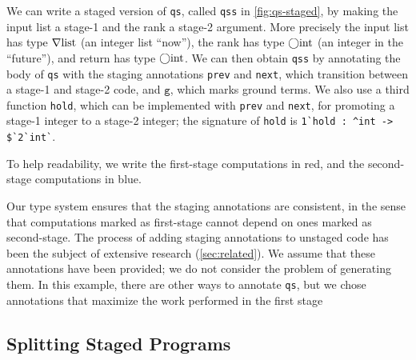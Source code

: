 \begin{abstrsyn}
We can write a staged version of \texttt{qs}, called
\texttt{qss} in \ref{fig:qs-staged}, by making the input list a
stage-1 and the rank a stage-2 argument. 
%
More precisely the input list
has type $\nabla\mathrm{list}$ (an integer list ``now''), the rank has
type $\bigcirc{\rm int}$ (an integer in the ``future''), and return has type
$\bigcirc{\rm int}$.  
%
We can then obtain \texttt{qss} by annotating the body of \texttt{qs}
with the staging annotations \texttt{prev} and \texttt{next}, which
transition between a stage-1 and stage-2 code, and $\texttt{g}$, which
marks ground terms.  
%
We also use a third function
\texttt{hold}, which can be implemented with \texttt{prev} and
\texttt{next}, for promoting a stage-1 integer to a stage-2 integer;
the signature of \texttt{hold} is
% 
\lstinline{1`hold : ^int -> $`2`int`}.

To help readability, we write the first-stage
computations in red, and the second-stage computations in blue.

Our type system ensures that the staging annotations are consistent,
in the sense that computations marked as first-stage cannot depend on
ones marked as second-stage.
%
The process of adding staging annotations to unstaged code has been
the subject of extensive research (\ref{sec:related}). We assume that
these annotations have been provided; we do not consider the problem
of generating them. In this example, there are other ways to annotate
\texttt{qs}, but we chose annotations that maximize the work performed
in the first stage







\subsection{Splitting Staged Programs}


\end{abstrsyn}
